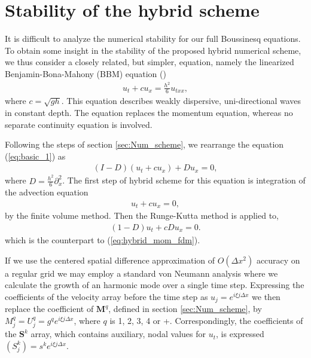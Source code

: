 \documentclass[review]{elsarticle}
\begin{document}
\appendix

\section{Stability of the hybrid scheme}
\label{append:stab}
It is difficult to analyze the numerical stability for  our full Boussinesq
equations. 
To obtain some insight in the  stability of the proposed hybrid numerical scheme,
we thus consider a closely related, but simpler, equation, namely the 
linearized Benjamin-Bona-Mahony (BBM)
equation (\cite{benjamin1972model}) 
\begin{align}
u_t + c u_x = \frac{h^2}{6}u_{txx},
\label{eq:basic_1}
\end{align}
where $c=\sqrt{gh}$.
This equation describes weakly dispersive, uni-directional waves in constant
depth. The equation replaces the momentum equation, whereas no separate
continuity equation is involved.

Following the steps of section \ref{sec:Num_scheme},
we rearrange 
the equation (\ref{eq:basic_1}) as
\begin{align}
(I-D)(u_t + c u_x) +Du_x = 0, \label{eq:basic_2}
\end{align}
where $D=\frac{h^2}{6}\partial_x^2$.
The first step of  hybrid scheme for  this equation is integration of
 the advection equation
\begin{align}
u_t + c u_x = 0,
\label{eq:append_advec}
\end{align}
by the finite volume method. 
Then the Runge-Kutta  method is applied to,
\begin{align}
(1-D)u_t + cDu_x = 0.
\label{eq:append_mom_fdm}
\end{align}
which is the counterpart to  (\ref{eq:hybrid_mom_fdm}).

If we use the centered spatial difference approximation of $O(\Delta x^2)$
accuracy on a regular grid we may employ a standard von Neumann analysis where we calculate the growth of an harmonic mode over a single time step.
Expressing the coefficients of the velocity array before the time step as  $u_j= e^{i\xi j \Delta x}$ we then replace the coefficient of $\textbf{M}^q$, defined in section \ref{sec:Num_scheme}, 
by $M_j^q=U_j^q= g^qe^{i\xi j \Delta x}$, 
where $q$ is 1, 2, 3, 4 or +. Correspondingly, the coefficients of the $\mathbf{S}^k$ array, which contains auxiliary,  nodal values for $u_t$,  is
expressed $(S_j^k)= s^k e^{i\xi j \Delta x}$. 
\end{document}
